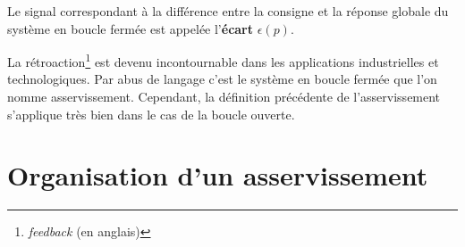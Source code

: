 \begin{itemize}
%                                      
%                                      
%
\begin{center}
\end{center}
          Le signal correspondant à la différence entre la consigne
          et la réponse globale du système en boucle fermée est
          appelée l'\textbf{écart} $\epsilon(p)$.
\end{itemize}

La rétroaction\footnote{\emph{feedback} (en anglais)} est devenu incontournable
dans les applications industrielles et technologiques. Par abus de langage 
c'est le système en boucle fermée que l'on nomme asservissement. Cependant, la 
définition précédente de l'asservissement s'applique très bien dans 
le cas de la boucle ouverte.

\clearpage
\section{Organisation d'un asservissement}

